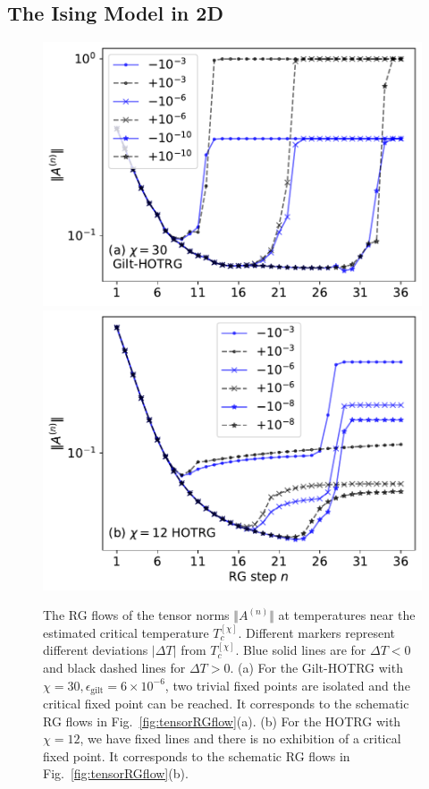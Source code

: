 \documentclass[aps,prb,reprint,superscriptaddress,floatfix]{revtex4-2}
\begin{document}
\subsection{The Ising Model in 2D\label{benchmark:2DIsing}}
\begin{figure}[tb]
    \includegraphics[width=\columnwidth]{./figures/AnormFlow-a.pdf}
    \includegraphics[width=\columnwidth]{./figures/AnormFlow-b.pdf}
    \caption{\label{fig:flowAnorm}
        The RG flows of the tensor norms $\Vert A^{(n)} \Vert$ at temperatures near the estimated critical temperature $T_c^{[\chi]}$. 
        Different markers represent different deviations $| \Delta T| $ from $T_c^{[\chi]}$. Blue solid lines are for $\Delta T<0$ and black dashed lines for $\Delta T>0$. 
        (a) For the Gilt-HOTRG with $\chi = 30,\epsilon_{\text{gilt}} = 6\times 10^{-6}$, two trivial fixed points are isolated and the critical fixed point can be reached. It corresponds to the schematic RG flows in Fig.~\ref{fig:tensorRGflow}(a). 
        (b) For the HOTRG with $\chi = 12$, we have fixed lines and there is no exhibition of a critical fixed point. 
        It corresponds to the schematic RG flows in Fig.~\ref{fig:tensorRGflow}(b).
    }
\end{figure}
\end{document}
